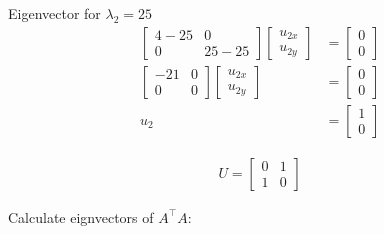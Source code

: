 \documentclass[11pt,letterpaper]{article}
\begin{document}
\begin{enumerate}
Eigenvector for \( \lambda_2 = 25 \)
\begin{align*}
    \begin{bmatrix}
        4-25 & 0 \\
        0 & 25-25
    \end{bmatrix}
    \begin{bmatrix}
        u_{2x} \\ u_{2y}
    \end{bmatrix}
    &= \begin{bmatrix}
        0 \\ 0
    \end{bmatrix} \\
    \begin{bmatrix}
        -21 & 0 \\
        0 & 0
    \end{bmatrix}
    \begin{bmatrix}
        u_{2x} \\ u_{2y}
    \end{bmatrix}
    &= \begin{bmatrix}
        0 \\ 0
    \end{bmatrix} \\
    u_2
    &= \begin{bmatrix}
        1 \\ 0
    \end{bmatrix}
\end{align*}

\begin{align*}
U = {\begin{bmatrix}
        0 & 1 \\
        1 & 0
    \end{bmatrix}}
\end{align*}

Calculate eignvectors of \( A^\top A \):


\end{enumerate}
\end{document}
